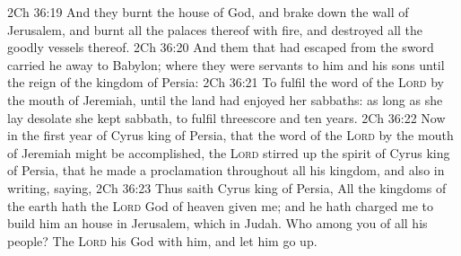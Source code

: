\vs 2Ch 36:19 And they burnt the house of God, and brake down the wall of Jerusalem, and burnt all the palaces thereof with fire, and destroyed all the goodly vessels thereof.
\vs 2Ch 36:20 And them that had escaped from the sword carried he away to Babylon; where they were servants to him and his sons until the reign of the kingdom of Persia:
\vs 2Ch 36:21 To fulfil the word of the \textsc{Lord} by the mouth of Jeremiah, until the land had enjoyed her sabbaths:  as long as she lay desolate she kept sabbath, to fulfil threescore and ten years.
\vs 2Ch 36:22 Now in the first year of Cyrus king of Persia, that the word of the \textsc{Lord}  by the mouth of Jeremiah might be accomplished, the \textsc{Lord} stirred up the spirit of Cyrus king of Persia, that he made a proclamation throughout all his kingdom, and  also in writing, saying,
\vs 2Ch 36:23 Thus saith Cyrus king of Persia, All the kingdoms of the earth hath the \textsc{Lord} God of heaven given me; and he hath charged me to build him an house in Jerusalem, which  in Judah. Who  among you of all his people? The \textsc{Lord} his God  with him, and let him go up.

